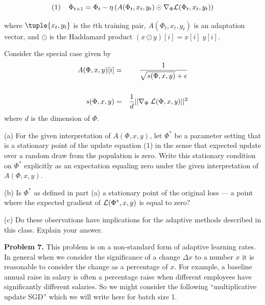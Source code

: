 \documentclass{article}
\newcommand{\solution}[1]{}
\begin{document}
$$(1)\;\;\;\;\Phi_{t+1} = \Phi_t - \eta\left(A(\Phi_t,x_t,y_t)\odot \nabla_\Phi {\cal L}(\Phi_t,x_t,y_t)\right)$$

where $\tuple{x_t,y_t}$ is the $t$th training pair, $A(\Phi_t,x_t,y_t)$ is an adaptation vector, and $\odot$ is the Haddamard product $(x \odot y)[i] = x[i]\;y[i]$.

Consider the special case given by
\begin{eqnarray*}
  A(\Phi,x,y)[i] & = & \frac{1}{\sqrt{s(\Phi,x,y)} + \epsilon} \\
  \\
  s(\Phi,x,y) & = & \frac{1}{d} ||\nabla_\Phi\;{\cal L}(\Phi,x,y)||^2 \\
\end{eqnarray*}
where $d$ is the dimension of $\Phi$.
\medskip

(a) For the given interpretation of $A(\Phi,x,y)$, let $\Phi^*$ be a parameter setting that is a stationary point of the update equation (1)
in the sense that expected update over a random draw from the population is zero.  Write this stationary condition
on $\Phi^*$ explicitly as an expectation equaling zero under the given interpretation of $A(\Phi,x,y)$.

\solution{
$$E_{\tuple{x,y} \sim \pop}\;\frac{1}{\sqrt{s(\Phi^*,x,y)+ \epsilon}}\;\nabla_\Phi\;{\cal L}(\Phi,x,y) = 0$$
}

\medskip
(b) Is $\Phi^*$ as defined in part (a) a stationary point of the original loss --- a point where the expected gradient of ${\cal L}(\Phi^*,x,y)$ is equal to zero?

\solution{
  No, the average a weighted sum is different from the average of an unweighted sum
  and hence the fact that the weighted average is zero does not imply that the average is zero.
  }
  
\medskip
(c) Do these observations have implications for the adaptive methods described in this class.  Explain your answer.

\solution{Yes, the example considered here is just a special case of RMSProp or Adam which are in fact not guaranteed to converge to a stationary point (or local optimum) of the loss function.}

\bigskip
{\bf Problem 7.}  This problem is on a non-standard form of adaptive learning rates.  In general when we consider the significance of a change $\Delta x$ to a number $x$ it is reasonable to consider
the change as a percentage of $x$.  For example, a baseline annual raise in salary is often a percentage raise when different employees have significantly different salaries.  So we might consider the following
``multiplicative update SGD'' which we will write here for batch size 1.
\end{document}
